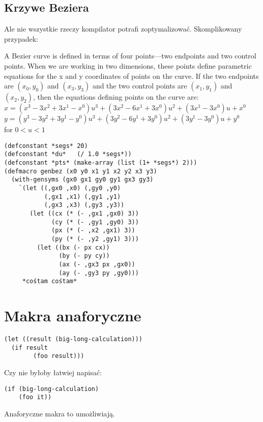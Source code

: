 \subsection{Krzywe Beziera}
\begin{frame}{}
Ale nie wszystkie rzeczy kompilator potrafi zoptymalizować.
Skomplikowany przypadek:

\begin{definition}
A Bezier curve is defined in terms of four points—two endpoints and two
control points. When we are working in two dimensions, these points define
parametric equations for the x and y coordinates of points on the curve. If the
two endpoints are $(x_0 , y_0 )$ and $(x_3 , y_3 )$ and the two control points are $(x_1 , y_1)$ and $(x_2, y_2)$,
then the equations defining points on the curve are:\\
             $x = (x^3 - 3x^2 + 3x^1 - x^0 )u^3 + (3x^2 - 6x^1 + 3x^0 )u^2 + (3x^1 - 3x^0 )u + x^0$\\
	     $y = (y^3 - 3y^2 + 3y^1 - y^0 )u^3 + (3y^2 - 6y^1 + 3y^0 )u^2 + (3y^1 - 3y^0 )u + y^0$\\
	     for $0 < u < 1$
\end{definition}
\end{frame}

\begin{frame}[fragile]{}
\begin{verbatim}
(defconstant *segs* 20)
(defconstant *du*   (/ 1.0 *segs*))
(defconstant *pts* (make-array (list (1+ *segs*) 2)))
(defmacro genbez (x0 y0 x1 y1 x2 y2 x3 y3)
  (with-gensyms (gx0 gx1 gy0 gy1 gx3 gy3)
    `(let ((,gx0 ,x0) (,gy0 ,y0)
           (,gx1 ,x1) (,gy1 ,y1)
           (,gx3 ,x3) (,gy3 ,y3))
       (let ((cx (* (- ,gx1 ,gx0) 3))
             (cy (* (- ,gy1 ,gy0) 3))
             (px (* (- ,x2 ,gx1) 3))
             (py (* (- ,y2 ,gy1) 3)))
         (let ((bx (- px cx))
               (by (- py cy))
               (ax (- ,gx3 px ,gx0))
               (ay (- ,gy3 py ,gy0)))
	 *cośtam cośtam*
\end{verbatim}
\end{frame}

\section{Makra anaforyczne}
\begin{frame}{}
\end{frame}

\begin{frame}[fragile]{}
\begin{verbatim}
(let ((result (big-long-calculation)))
  (if result
        (foo result)))
\end{verbatim}
\pause
Czy nie byłoby łatwiej napisać:
\begin{verbatim}
(if (big-long-calculation)
    (foo it))
\end{verbatim}
Anaforyczne makra to umożliwiają.
\end{frame}
